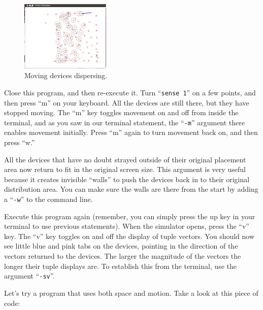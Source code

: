 \documentclass{article}
\newcommand\qvar[1]{``{\tt #1}''}
\begin{document}
\begin{figure}
  \includegraphics[width=0.38\textwidth]{figures/motion.png}
  \caption{Moving devices dispersing.}
  \vspace{-0.5cm}
  \label{f:motion}
\end{figure}

Close this program, and then re-execute it.  Turn \qvar{sense 1} on a
few points, and then press ``m'' on your keyboard.  All the devices
are still there, but they have stopped moving.  The ``m'' key toggles
movement on and off from inside the terminal, and as you saw in our
terminal statement, the \qvar{-m} argument there enables movement
initially.  Press ``m'' again to turn movement back on, and then press
``w.''

All the devices that have no doubt strayed outside of their original
placement area now return to fit in the original screen size.  This
argument is very useful because it creates invisible ``walls'' to push
the devices back in to their original distribution area.  You can make
sure the walls are there from the start by adding a \qvar{-w} to the
command line.

Execute this program again (remember, you can simply press the up key
in your terminal to use previous statements).  When the simulator
opens, press the ``v'' key.  The ``v'' key toggles on and off the
display of tuple vectors.  You should now see little blue and pink
tabs on the devices, pointing in the direction of the vectors returned
to the devices.  The larger the magnitude of the vectors the longer
their tuple displays are.  To establish this from the terminal, use
the argument \qvar{-sv}.

Let's try a program that uses both space and motion. Take a look at
this piece of code:
\end{document}
